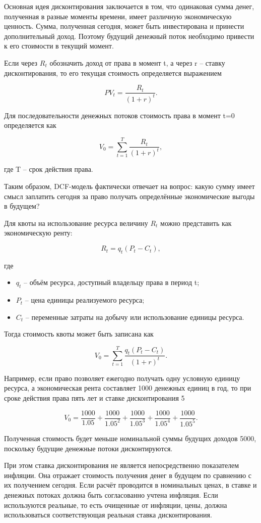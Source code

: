 \documentclass[12pt]{article}
\begin{document}
Основная идея дисконтирования заключается в том, что одинаковая сумма денег, полученная в разные моменты времени, имеет различную экономическую ценность. Сумма, полученная сегодня, может быть инвестирована и принести дополнительный доход. Поэтому будущий денежный поток необходимо привести к его стоимости в текущий момент.

Если через $R_t$ обозначить доход от права в момент t, а через r -- ставку дисконтирования, то его текущая стоимость определяется выражением

\[
PV_t = \frac{R_t}{(1+r)^t}.
\]

Для последовательности денежных потоков стоимость права в момент t=0 определяется как

\[
V_0 =
\sum_{t=1}^{T}
\frac{R_t}{(1+r)^t},
\]

где T -- срок действия права.

Таким образом, DCF-модель фактически отвечает на вопрос: какую сумму имеет смысл заплатить сегодня за право получать определённые экономические выгоды в будущем?

Для квоты на использование ресурса величину $R_t$ можно представить как экономическую ренту:

\[
R_t = q_t(P_t-C_t),
\]

где

\begin{itemize}
\item $q_t$ -- объём ресурса, доступный владельцу права в период t;
\item $P_t$ -- цена единицы реализуемого ресурса;
\item $C_t$ -- переменные затраты на добычу или использование единицы ресурса.
\end{itemize}

Тогда стоимость квоты может быть записана как

\[
V_0 =
\sum_{t=1}^{T}
\frac{q_t(P_t-C_t)}{(1+r)^t}.
\]

Например, если право позволяет ежегодно получать одну условную единицу ресурса, а экономическая рента составляет 1000 денежных единиц в год, то при сроке действия права пять лет и ставке дисконтирования 5%

\[
V_0 =
\frac{1000}{1.05}
+\frac{1000}{1.05^2}
+\frac{1000}{1.05^3}
+\frac{1000}{1.05^4}
+\frac{1000}{1.05^5}.
\]

Полученная стоимость будет меньше номинальной суммы будущих доходов 5000, поскольку будущие денежные потоки дисконтируются.

При этом ставка дисконтирования не является непосредственно показателем инфляции. Она отражает стоимость получения денег в будущем по сравнению с их получением сегодня. Если расчёт проводится в номинальных ценах, в ставке и денежных потоках должна быть согласованно учтена инфляция. Если используются реальные, то есть очищенные от инфляции, цены, должна использоваться соответствующая реальная ставка дисконтирования.
\end{document}
